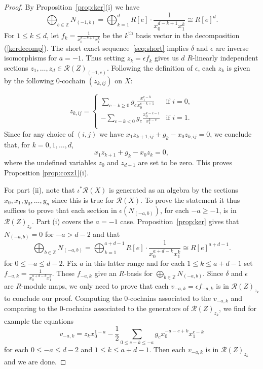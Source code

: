 \documentclass[a4paper,11pt]{amsart}
\theoremstyle{plain}
\theoremstyle{definition}
\newcommand{\R}{\mathcal{R}}
\newcommand{\Z}{\mathbb{Z}}
\begin{document}
\begin{proof}
By Proposition~\ref{prop:ker}(i) we have
\begin{equation}\label{kerdecomp}
\bigoplus_{b\in \Z} N_{(-1,b)} = \bigoplus_{k = 1}^d R[e]\cdot \frac{1}{x_0^{d-k+1} x_1^k} \cong R[e]^d.
\end{equation}
For $1 \leq k \leq d$, let $f_k = \frac{1}{x_0^{d-k+1}x_1^k}$ be the $k^{\text{th}}$ basis vector in the decomposition (\ref{kerdecomp}). The short exact sequence~\eqref{seq:short} implies $\delta$ and $\epsilon$ are inverse isomorphisms for $a = -1$. Thus setting $z_k = \epsilon f_k$ gives us $d$ $R$-linearly independent sections $z_1, \dots, z_d \in \R(Z)_{(-1,e)}$. Following the definition of $\epsilon$, each $z_k$ is given by the following $0$-cochain $(z_{k,ij})$ on $X$:

\begin{equation*}
z_{k,ij} =
 \left\{
  \begin{array}{ll}
			 \sum_{c-k \geqslant 0} g_c \frac{x_1^{c-k}}{x_0^{c-k+1}} & \mbox{if } i = 0, \\
			 -\sum_{c-k < 0} g_c \frac{x_0^{k-c-1}}{x_1^{k-c}} & \mbox{if } i = 1. \\
		\end{array}
		\right.
\end{equation*}
Since for any choice of $(i,j)$ we have $x_1 z_{k+1,ij} + g_k - x_0 z_{k,ij} = 0$, we conclude that, for $k = 0,1,\dots,d$,
\begin{equation*}
    x_1 z_{k+1} + g_k - x_0 z_{k} = 0,
\end{equation*}
where the undefined variables $z_0$ and $z_{d+1}$ are set to be zero. This proves Proposition \ref{prop:coxz1}(i). 


For part (ii), note that $\iota^*\R(X)$ is generated as an algebra by the sections $x_0,x_1,y_0,\dots,y_n$ since this is true for $\R(X)$. To prove the statement it thus suffices to prove that each section in $\epsilon(N_{(-a,b)})$, for each $-a \geq -1$, is in $\R(Z)_{z_k}$. Part (i) covers the $a=-1$ case. Proposition~\ref{prop:ker} gives that $N_{(-a,b)}= 0$ for $-a > d-2$ and that
\begin{equation*}
\bigoplus_{b\in \Z} N_{(-a,b)} = \bigoplus_{k = 1}^{a+d-1} R[e]\cdot \frac{1}{x_0^{a+d-k} x_1^k} \cong R[e]^{a+d-1}.
\end{equation*}
for $0 \leq -a \leq d-2$. Fix $a$ in this latter range and for each $1 \leq k \leq a+d-1$ set $f_{-a,k} = \frac{1}{x_0^{a+d-k}x_1^k}$. These $f_{-a,k}$ give an $R$-basis for $\bigoplus_{b \in \Z} N_{(-a,b)}$. Since $\delta$ and $\epsilon$ are $R$-module maps, we only need to prove that each $v_{-a,k} = \epsilon f_{-a,k}$ is in $\R(Z)_{z_k}$ to conclude our proof. Computing the $0$-cochains associated to the $v_{-a,k}$ and comparing to the $0$-cochains associated to the generators of $\R(Z)_{z_k}$, we find for example the equations
\[
v_{-a,k} = z_k x_0^{1-a} - \frac{1}{2} \sum_{0 \leq c-k \leq -a} g_c x_0^{-a-c+k} x_1^{c-k}
\]
for each $0 \leq -a \leq d-2$ and $1 \leq k \leq a+d-1$. Then each $v_{-a,k}$ is in $\R(Z)_{z_k}$ and we are done.
\end{proof}
\end{document}
